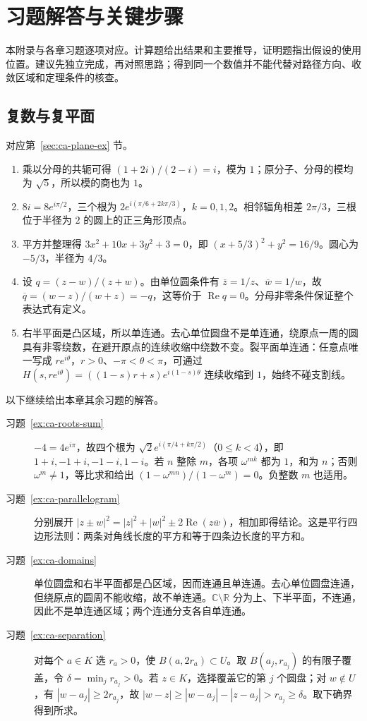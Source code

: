 \setcounter{chapter}{1} %
\chapter{习题解答与关键步骤}
\label{chap:ca-solutions}

本附录与各章习题逐项对应。计算题给出结果和主要推导，证明题指出假设的使用位置。建议先独立完成，再对照思路；得到同一个数值并不能代替对路径方向、收敛区域和定理条件的核查。

\section{复数与复平面}
对应第~\ref{sec:ca-plane-ex} 节。
\begin{enumerate}
 \item 乘以分母的共轭可得 $(1+2i)/(2-i)=i$，模为 $1$；原分子、分母的模均为 $\sqrt5$，所以模的商也为 $1$。
 \item $8i=8e^{i\pi/2}$，三个根为 $2e^{i(\pi/6+2k\pi/3)}$，$k=0,1,2$。相邻辐角相差 $2\pi/3$，三根位于半径为 $2$ 的圆上的正三角形顶点。
 \item 平方并整理得 $3x^2+10x+3y^2+3=0$，即 $(x+5/3)^2+y^2=16/9$。圆心为 $-5/3$，半径为 $4/3$。
 \item 设 $q=(z-w)/(z+w)$。由单位圆条件有 $\overline z=1/z$、$\overline w=1/w$，故 $\overline q=(w-z)/(w+z)=-q$，这等价于 $\operatorname{Re}q=0$。分母非零条件保证整个表达式有定义。
 \item 右半平面是凸区域，所以单连通。去心单位圆盘不是单连通，绕原点一周的圆具有非零绕数，在避开原点的连续收缩中绕数不变。裂平面单连通：任意点唯一写成 $re^{i\theta}$，$r>0$、$-\pi<\theta<\pi$，可通过 $H(s,re^{i\theta})=((1-s)r+s)e^{i(1-s)\theta}$ 连续收缩到 $1$，始终不碰支割线。
\end{enumerate}

以下继续给出本章其余习题的解答。
\begin{description}
 \item[习题~\ref{ex:ca-roots-sum}]
 $-4=4e^{i\pi}$，故四个根为 $\sqrt2e^{i(\pi/4+k\pi/2)}$（$0\le k<4$），即 $1+i,-1+i,-1-i,1-i$。若 $n$ 整除 $m$，各项 $\omega^{mk}$ 都为 $1$，和为 $n$；否则 $\omega^m\ne1$，等比求和给出 $(1-\omega^{mn})/(1-\omega^m)=0$。负整数 $m$ 也适用。
 \item[习题~\ref{ex:ca-parallelogram}]
 分别展开 $|z\pm w|^2=|z|^2+|w|^2\pm2\operatorname{Re}(z\overline w)$，相加即得结论。这是平行四边形法则：两条对角线长度的平方和等于四条边长度的平方和。
 \item[习题~\ref{ex:ca-domains}]
 单位圆盘和右半平面都是凸区域，因而连通且单连通。去心单位圆盘连通，但绕原点的圆周不能收缩，故不单连通。$\mathbb{C}\setminus\mathbb{R}$ 分为上、下半平面，不连通，因此不是单连通区域；两个连通分支各自单连通。
 \item[习题~\ref{ex:ca-separation}]
 对每个 $a\in K$ 选 $r_a>0$，使 $B(a,2r_a)\subset U$。取 $B(a_j,r_{a_j})$ 的有限子覆盖，令 $\delta=\min_jr_{a_j}>0$。若 $z\in K$，选择覆盖它的第 $j$ 个圆盘；对 $w\notin U$，有 $|w-a_j|\ge2r_{a_j}$，故 $|w-z|\ge|w-a_j|-|z-a_j|>r_{a_j}\ge\delta$。取下确界得到所求。
\end{description}



